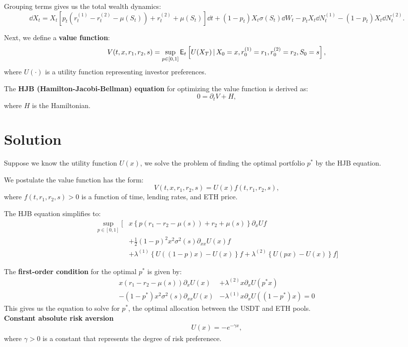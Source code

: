 \documentclass{article} %
\theoremstyle{plain}
\theoremstyle{definition} %
\begin{document}
Grouping terms gives us the total wealth dynamics:
\[
\dd X_t = X_t \left[p_t (r^{(1)}_t - r^{(2)}_t - \mu(S_t)) + r^{(2)}_t + \mu(S_t) \right] \dd t + (1 - p_t) X_t \sigma(S_t) \dd W_t - p_t X_t \dd N^{(1)}_t - (1-p_t) X_t \dd N^{(2)}_t.
\]

Next, we define a \textbf{value function}:
\[
V(t, x, r_1, r_2, s) = \sup_{p \in [0,1]} \mathbb{\sf E}_t \left[ U(X_T) \,|\, X_0 = x, r^{(1)}_0 = r_1, r^{(2)}_0 = r_2, S_0 = s \right],
\]
where $U(\cdot)$ is a utility function representing investor preferences.

The \textbf{HJB (Hamilton-Jacobi-Bellman) equation} for optimizing the value function is derived as:
\[
0 = \partial_t V + H,
\]
where $H$ is the Hamiltonian.

\section{Solution}
Suppose we know the utility function $U(x)$,
 we solve the problem of finding the optimal portfolio $p^*$ by the HJB equation.

We postulate the value function has the form:
\[
V(t, x, r_1, r_2, s) = U(x) f(t, r_1, r_2, s),
\]
where $f(t, r_1, r_2, s)>0$ is a function of time, lending rates, and ETH price.

The HJB equation simplifies to:
\begin{align*}
\sup_{p \in [0, 1]} 
\Big[ &x \left\{ p \left( r_1 - r_2 - \mu(s) \right) + r_2 + \mu(s) \right\}\partial_x U f\\
&+\frac{1}{2}(1-p)^2x^2 \sigma^2(s) \partial_{xx}U(x)f\\
&+\lambda^{(1)}\left\{U((1-p)x) - U(x)\right\}f
+\lambda^{(2)}\left\{U(px) - U(x)\right\}f
\Big]
\end{align*}

The \textbf{first-order condition} for the optimal $p^*$ is given by:
\begin{align*}
x(r_1 - r_2 - \mu(s))\partial_xU(x) &+\lambda^{(2)}x\partial_xU(p^*x)\\
- (1-p^*)x^2\sigma^2(s)\partial_{xx}U(x)
&-\lambda^{(1)}x\partial_xU((1-p^*)x)
=0
\end{align*}
This gives us the equation to solve for $p^*$, the optimal allocation between the USDT and ETH pools.\\

\textbf{Constant absolute risk aversion}
\begin{align*}
  U(x) = -e^{-\gamma x},
  \end{align*}
  where $\gamma>0$ is a constant that represents the degree of risk preferenece.\\
\end{document}
